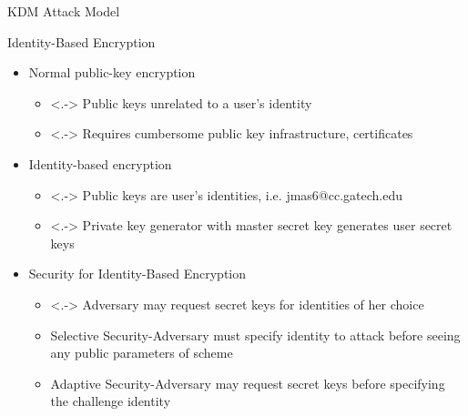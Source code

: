 \begin{frame}{KDM Attack Model}
\begin{figure}
    \end{figure}

  \end{frame}

\begin{frame}{Identity-Based Encryption}
\begin{itemize}
\item<+-> Normal public-key encryption
\begin{itemize}
\item<.-> Public keys unrelated to a
  user's identity
\smallskip
\item<.-> Requires cumbersome public key infrastructure, certificates
\end{itemize}
\item<+-> Identity-based encryption
\begin{itemize}
\item<.-> Public keys are user's identities,
  i.e. \textsf{jmas6@cc.gatech.edu}
\smallskip
\item<.-> Private key generator with master secret key generates user
  secret keys
\end{itemize}
\item<+-> Security for Identity-Based Encryption
\begin{itemize}
\item<.-> Adversary may request secret keys for identities of her
  choice
\smallskip
\item<+-> \alert{Selective Security}-Adversary must specify identity
  to attack before seeing any public parameters of scheme
\smallskip
\item<+-> \alert{Adaptive Security}-Adversary may request secret keys
before specifying the challenge identity
\end{itemize}
\end{itemize}
\end{frame}



